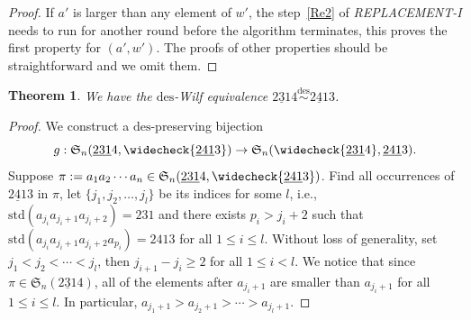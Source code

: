 \documentclass[11pt,reqno]{amsart}
\numberwithin{equation}{section}
\theoremstyle{plain}
\newtheorem{theorem}{Theorem}[section]
\theoremstyle{definition}
\renewcommand{\S}{\mathfrak{S}}
\def\des{\mathrm{des}}
\def\std{\mathrm{std}}
\begin{document}
\begin{proof}
  If $a'$ is larger than any element of $w'$, the step~\ref{Re2} of \textit{REPLACEMENT-I} needs to run for another round before the algorithm terminates, this proves the first property for $(a',w')$. The proofs of other properties should be straightforward and we omit them.
\end{proof}


\begin{theorem}
  We have the $\des$-Wilf equivalence $\underline{231}4 \overset{\des}{\sim }\underline{241}3$. \label{231-4--241-3}
\end{theorem}

\begin{proof}
  We construct a $\des$-preserving bijection
  $$g: \S_n(\underline{231}4,\widecheck{\underline{241}3}) \to \S_n(\widecheck{\underline{231}4},\underline{241}3).$$
  Suppose $\pi:=a_1a_2\cdots a_n\in \S_n(\underline{231}4,\widecheck{\underline{241}3})$. 
  Find all occurrences of $\underline{241}3$ in $\pi$, let $\{j_1,j_2,\ldots,j_l\}$
  be its indices for some $l$, i.e., $\std(a_{j_i}a_{j_i+1}a_{j_i+2})=231$ and there exists $p_i>j_i+2$
  such that $\std(a_{j_i}a_{j_i+1}a_{j_i+2}a_{p_i})=2413$ for all $1\le i \le l$.
  Without loss of generality, set $j_1<j_2<\cdots<j_l$, then $j_{i+1}-j_i\ge 2$ for all $1\le i < l$.
  We notice that since $\pi \in \mathfrak{S}_n(\underline{231}4)$, all of the elements after $a_{j_i+1}$ are smaller than $a_{j_i+1}$ for all $1\le i \le l$. In particular, $a_{j_1+1}>a_{j_2+1}>\cdots>a_{j_l+1}$.
    

\end{proof}
\end{document}
